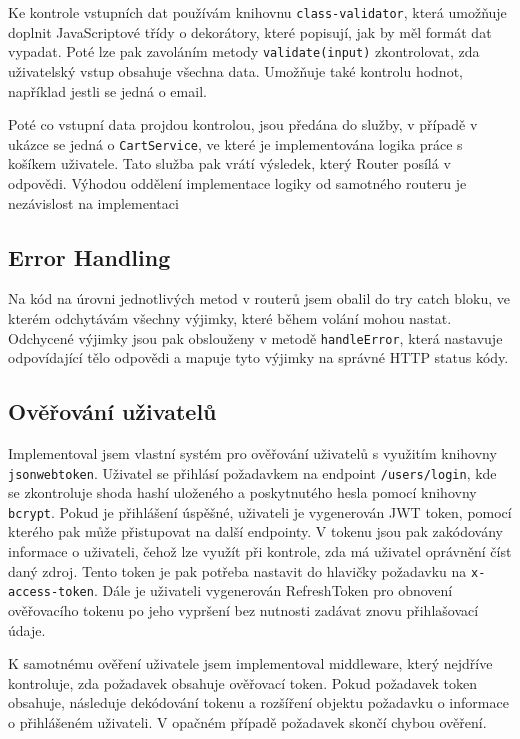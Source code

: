 \documentclass[thesis=M,czech]{FITthesis}[2019/12/23]
\begin{document}
Ke kontrole vstupních dat používám knihovnu \texttt{class-validator}, která umožňuje doplnit JavaScriptové třídy o dekorátory, které popisují, jak by měl formát dat vypadat. Poté lze pak zavoláním metody \texttt{validate(input)} zkontrolovat, zda uživatelský vstup obsahuje všechna data. Umožňuje také kontrolu hodnot, například jestli se jedná o email.

Poté co vstupní data projdou kontrolou, jsou předána do služby, v případě v ukázce se jedná o \texttt{CartService}, ve které je implementována logika práce s košíkem uživatele. Tato služba pak vrátí výsledek, který Router posílá v odpovědi. Výhodou oddělení implementace logiky od samotného routeru je nezávislost na implementaci

\subsection{Error Handling}
Na kód na úrovni jednotlivých metod v routerů jsem obalil do try catch bloku, ve kterém odchytávám všechny výjimky, které během volání mohou nastat. Odchycené výjimky jsou pak obslouženy v metodě \texttt{handleError}, která nastavuje odpovídající tělo odpovědi a mapuje tyto výjimky na správné HTTP status kódy.

\subsection{Ověřování uživatelů}
Implementoval jsem vlastní systém pro ověřování uživatelů s využitím knihovny \texttt{jsonwebtoken}. Uživatel se přihlásí požadavkem na endpoint \texttt{/users/login}, kde se zkontroluje shoda hashí uloženého a poskytnutého hesla pomocí knihovny \texttt{bcrypt}. Pokud je přihlášení úspěšné, uživateli je vygenerován JWT token, pomocí kterého pak může přistupovat na další endpointy. V tokenu jsou pak zakódovány informace o uživateli, čehož lze využít při kontrole, zda má uživatel oprávnění číst daný zdroj. Tento token je pak potřeba nastavit do hlavičky požadavku na \texttt{x-access-token}. Dále je uživateli vygenerován RefreshToken pro obnovení ověřovacího tokenu po jeho vypršení bez nutnosti zadávat znovu přihlašovací údaje.

K samotnému ověření uživatele jsem implementoval middleware, který nejdříve kontroluje, zda požadavek obsahuje ověřovací token. Pokud požadavek token obsahuje, následuje dekódování tokenu a rozšíření objektu požadavku o informace o přihlášeném uživateli. V opačném případě požadavek skončí chybou ověření.
\end{document}
